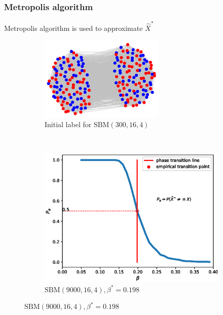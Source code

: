 \documentclass[notheorems]{beamer}
\begin{document}
\begin{frame}
\frametitle{Metropolis algorithm}
Metropolis algorithm is used to approximate $\hat{X}^*$


\begin{figure}
	\centering
	\begin{subfigure}{0.45\textwidth}
		\includegraphics[width=\textwidth]{000.png}
		\caption{Initial label for $\textrm{SBM}(300, 16, 4)$}
	\end{subfigure}~
	\begin{subfigure}{0.53\textwidth}
		\includegraphics[width=\textwidth]{beta_trans-2020-11-28.eps}
		\caption{$\textrm{SBM}(9000, 16, 4), \beta^*=0.198$}
	\end{subfigure}
\end{figure}
\end{frame}
\end{document}
